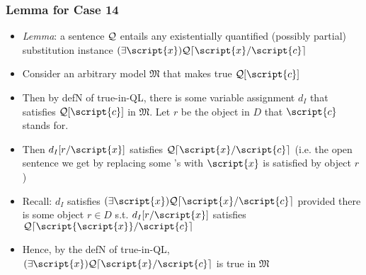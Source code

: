 \begin{frame}
\frametitle{Lemma for Case 14}

\begin{itemize}[<+->]

\item \emph{Lemma}: a sentence $\mathcal{Q}$ entails any existentially quantified (possibly partial) substitution instance $\qt{\exists}{\script{x}}\metav{Q}\substitutesome{\script{c}}{\script{x}}$

\item Consider an arbitrary model $\mathfrak{M}$ that makes true $\metav{Q}[\script{c}]$

\item Then by defN of true-in-QL, there is some variable assignment $d_I$ that satisfies $\metav{Q}[\script{c}]$ in $\mathfrak{M}$. Let $r$ be the object in $D$ that $\script{c}$ stands for.

\item Then $d_I [r/\script{x}]$ satisfies $\metav{Q}\substitutesome{\script{c}}{\script{x}}$ (i.e. the open sentence we get by replacing some 's with $\script{x}$ is satisfied by object $r$)


\item Recall: $d_I$ satisfies $\qt{\exists}{\script{x}}\metav{Q}\substitutesome{\script{c}}{\script{x}}$ provided there is some object $r \in D$ s.t. $d_I [r/\script{x}]$ satisfies $\metav{Q}\substitutesome{\script{c}}{\script{\script{x}}}$

\item Hence, by the defN of true-in-QL, $\qt{\exists}{\script{x}}\metav{Q}\substitutesome{\script{c}}{\script{x}}$ is true in $\mathfrak{M}$


\end{itemize}
\end{frame}





